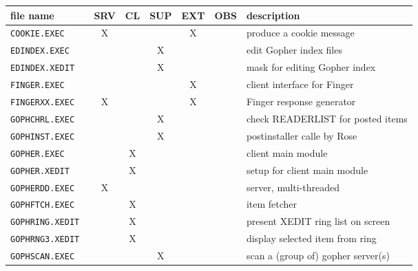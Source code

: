 \begin{appendix}
\noindent\begin{footnotesize}
\begin{tabular}{|l||c|c|c|c|c||l|} \hline
file name               &SRV&CL&SUP&EXT&OBS&description                     \\
\hline\hline
{\tt COOKIE.EXEC      } & X &  &   & X &   &produce a cookie message        \\
{\tt EDINDEX.EXEC     } &   &  & X &   &   &edit Gopher index files         \\
{\tt EDINDEX.XEDIT    } &   &  & X &   &   &mask for editing Gopher index   \\
{\tt FINGER.EXEC      } &   &  &   & X &   &client interface for Finger     \\
{\tt FINGERXX.EXEC    } & X &  &   & X &   &Finger response generator       \\
\hline
{\tt GOPHCHRL.EXEC    } &   &  & X &   &   &check READERLIST for posted items\\
{\tt GOPHINST.EXEC    } &   &  & X &   &   &postinstaller calle by Rose\\
{\tt GOPHER.EXEC      } &   &X &   &   &   &client main module              \\
{\tt GOPHER.XEDIT     } &   &X &   &   &   &setup for client main module    \\
{\tt GOPHERDD.EXEC    } & X &  &   &   &   &server, multi-threaded          \\
{\tt GOPHFTCH.EXEC    } &   &X &   &   &   &item fetcher                    \\
{\tt GOPHRING.XEDIT   } &   &X &   &   &   &present XEDIT ring list on screen\\
{\tt GOPHRNG3.XEDIT   } &   &X &   &   &   &display selected item from ring\\
{\tt GOPHSCAN.EXEC    } &   &  & X &   &   &scan a (group of) gopher server(s)\\

\end{tabular}
\end{footnotesize}
\end{appendix}
